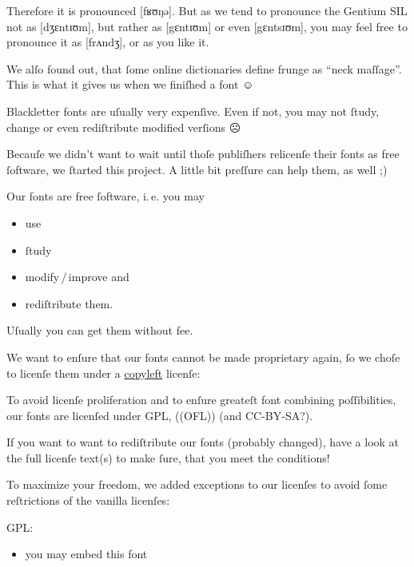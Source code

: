 \documentclass[
  ngerman,
  titlepage=no
]{scrartcl}
\newcommand*\smiley{{\larger[3]☺}} %
\newcommand*\frowney{{\larger[3]☹}}
\newcommand*\winkey{;)}       %
\newcommand*\spokenlanguage[1]{\mbox{#1}} %
\begin{document}
Therefore it is pronounced \spokenlanguage{[fʁʊŋə]}. But as we tend to pronounce the Gentium SIL
not as \spokenlanguage{[dʒɛntɪʊm]}, but rather as \spokenlanguage{[gɛntɪʊm]} or even \spokenlanguage{[gɛntsɪʊm]}, you may feel free to pronounce it as \spokenlanguage{[frʌndʒ]}, or as you like it.

We alſo found out, that ſome online dictionaries define frunge as “neck
maſſage”. This is what it gives us when we finiſhed a font \smiley

Blackletter fonts are uſually very expenſive. Even if not, you may not ſtudy,
change or even rediſtribute modified verſions \frowney

Becauſe we didn’t want to wait until thoſe publiſhers relicenſe their fonts as
free ſoftware, we ſtarted this project. A little bit preſſure can help them, as
well \winkey

Our fonts are free ſoftware, i.\,e. you may
\begin{itemize}
\item use
\item ſtudy
\item modify\,/\,improve and
\item rediſtribute them.
\end{itemize}

Uſually you can get them without fee.

We want to enſure that our fonts cannot be made proprietary again, ſo we
choſe to licenſe them under a
\href{http://en.wikipedia.org/wiki/Copyleft}{copyleft} licenſe:

To avoid licenſe proliferation and to enſure greateſt font combining
poſſibilities, our fonts are licenſed under GPL, ((OFL)) (and CC-BY-SA?). 

If you want to want to rediſtribute our fonts (probably changed), have a look at
the full licenſe text(s) to make ſure, that you meet the conditions!

To maximize your freedom, we added exceptions to our licenſes to avoid ſome
reſtrictions of the vanilla licenſes:

GPL:
\begin{itemize}
\item you may embed this font
\end{itemize}
\end{document}
